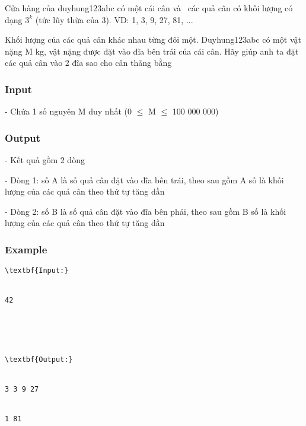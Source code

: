 



   Cửa hàng của duyhung123abc có một cái cân và  các quả cân có khối lượng có dạng $3^{k}$   (tức lũy thừa của 3). VD: 1, 3, 9, 27, 81, ...  

   Khối lượng của các quả cân khác nhau từng đôi một. Duyhung123abc có một vật nặng M kg, vật nặng được đặt vào đĩa bên trái của cái cân. Hãy giúp anh ta đặt các quả cân vào 2 đĩa sao cho cân thãng bằng  

\subsubsection{   Input  }

   - Chứa 1 số nguyên M duy nhất (0  $\le$  M  $\le$  100 000 000)  

\subsubsection{   Output  }

   - Kết quả gồm 2 dòng  

   - Dòng 1: số A là số quả cân đặt vào đĩa bên trái, theo sau gồm A số là khối lượng của các quả cân theo thứ tự tăng dần  

   - Dòng 2: số B là số quả cân đặt vào đĩa bên phải, theo sau gồm B số là khối lượng của các quả cân theo thứ tự tăng dần  

\subsubsection{   Example  }
\begin{verbatim}
\textbf{Input:}


42





\textbf{Output:}


3 3 9 27


1 81


\end{verbatim}
